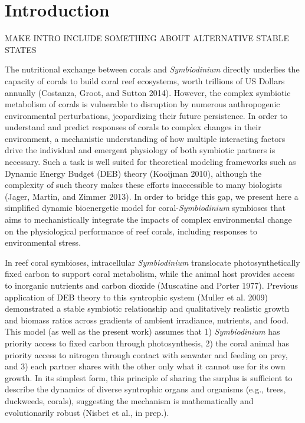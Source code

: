 \documentclass[]{elsarticle} %
\begin{document}
\section{Introduction}\label{introduction}

MAKE INTRO INCLUDE SOMETHING ABOUT ALTERNATIVE STABLE STATES

The nutritional exchange between corals and \emph{Symbiodinium} directly
underlies the capacity of corals to build coral reef ecosystems, worth
trillions of US Dollars annually (Costanza, Groot, and Sutton 2014).
However, the complex symbiotic metabolism of corals is vulnerable to
disruption by numerous anthropogenic environmental perturbations,
jeopardizing their future persistence. In order to understand and
predict responses of corals to complex changes in their environment, a
mechanistic understanding of how multiple interacting factors drive the
individual and emergent physiology of both symbiotic partners is
necessary. Such a task is well suited for theoretical modeling
frameworks such as Dynamic Energy Budget (DEB) theory (Kooijman 2010),
although the complexity of such theory makes these efforts inaccessible
to many biologists (Jager, Martin, and Zimmer 2013). In order to bridge
this gap, we present here a simplified dynamic bioenergetic model for
coral-\emph{Symbiodinium} symbioses that aims to mechanistically
integrate the impacts of complex environmental change on the
physiological performance of reef corals, including responses to
environmental stress.

In reef coral symbioses, intracellular \emph{Symbiodinium} translocate
photosynthetically fixed carbon to support coral metabolism, while the
animal host provides access to inorganic nutrients and carbon dioxide
(Muscatine and Porter 1977). Previous application of DEB theory to this
syntrophic system (Muller et al. 2009) demonstrated a stable symbiotic
relationship and qualitatively realistic growth and biomass ratios
across gradients of ambient irradiance, nutrients, and food. This model
(as well as the present work) assumes that 1) \emph{Symbiodinium} has
priority access to fixed carbon through photosynthesis, 2) the coral
animal has priority access to nitrogen through contact with seawater and
feeding on prey, and 3) each partner shares with the other only what it
cannot use for its own growth. In its simplest form, this principle of
sharing the surplus is sufficient to describe the dynamics of diverse
syntrophic organs and organisms (e.g., trees, duckweeds, corals),
suggesting the mechanism is mathematically and evolutionarily robust
(Nisbet et al., in prep.).
\end{document}
